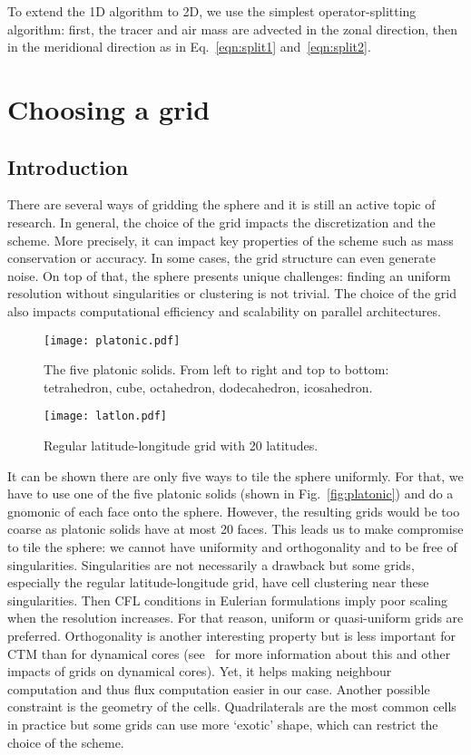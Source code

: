 To extend the 1D algorithm to 2D, we use the simplest operator-splitting algorithm:
first, the tracer and air mass are advected in the zonal direction, then in the meridional
direction as in Eq.~\eqref{eqn:split1}
and~\eqref{eqn:split2}.

\section{Choosing a grid}
\label{sec:grids}
\subsection{Introduction}
There are several ways of gridding the sphere and it is still an active topic of
research. In general, the choice of the grid impacts the discretization and the
scheme. More precisely, it can impact key properties of the scheme such as mass
conservation or accuracy.  In some cases, the grid structure can even generate
noise. On top of that, the sphere presents unique challenges: finding an uniform
resolution without singularities or clustering is not trivial. The choice of the
grid also impacts computational efficiency and scalability on parallel
architectures.

\begin{figure}
  \begin{minipage}{0.48\linewidth}
    \centering
    \texttt{[image: platonic.pdf]}
    \caption{The five platonic solids. From left to right and top to bottom:
      tetrahedron, cube, octahedron, dodecahedron, icosahedron.}
\label{fig:platonic}
  \end{minipage}
  \hfill
  \begin{minipage}{0.48\linewidth}
    \centering
    \texttt{[image: latlon.pdf]}
    \caption{Regular latitude-longitude grid with 20 latitudes.}
\label{fig:latlon}
  \end{minipage}
\end{figure}
It can be shown there are only five ways to tile the sphere uniformly. For that,
we have to use one of the five platonic solids (shown in
Fig.~\ref{fig:platonic}) and do a \gls{gnomonic} of each face onto the sphere.
However, the resulting grids would be too coarse as platonic solids have at most
20 faces. This leads us to make compromise to tile the sphere: we cannot have
uniformity and orthogonality and to be free of singularities. Singularities are
not necessarily a drawback but some grids, especially the regular
latitude-longitude grid, have cell clustering near these singularities. Then
CFL conditions in Eulerian formulations imply poor scaling when the resolution
increases. For that reason, uniform or quasi-uniform grids are preferred.
Orthogonality is another interesting property but is less important for
\gls{CTM} than for dynamical cores (see~\cite{Staniforth2012} for more
information about this and other impacts of grids on dynamical cores). Yet, it
helps making neighbour computation and thus flux computation easier in our case.
Another possible constraint is the geometry of the cells. Quadrilaterals are the
most common cells in practice but some grids can use more `exotic' shape, which
can restrict the choice of the scheme.

